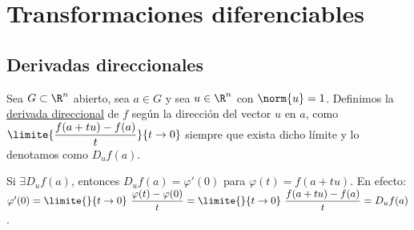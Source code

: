 \chapter{Transformaciones diferenciables}
	\section{Derivadas direccionales}
	
	\begin{defi} Sea $G\subset \R^n$ abierto, sea $a\in G$ y sea $u\in \R^n$ con $\norm{u}=1$. Definimos la \underline{derivada direccional} de $f$ según la dirección del vector $u$ en $a$, como $\limite{\dfrac{f(a+tu)-f(a)}{t}}{t\rightarrow 0}$ siempre que exista dicho límite y lo denotamos como $D_uf(a)$.
	\begin{observacion} Si $\exists D_uf(a)$, entonces $D_uf(a)=\varphi'(0)$ para $\varphi(t)=f(a+tu)$. En efecto:\\ $\varphi'(0)=\limite{}{t\rightarrow0}\ \dfrac{\varphi(t)-\varphi(0)}{t}=\limite{}{t\rightarrow0}\ \dfrac{f(a+tu)-f(a)}{t}=D_uf(a)$.
	\end{observacion}
	\end{defi}
	
